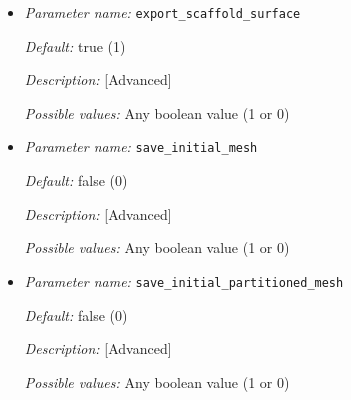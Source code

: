 \begin{itemize}
{\it Description:} [Advanced] 

{\it Possible values:} Any boolean value (1 or 0)


\item {\it Parameter name:} {\tt export\_scaffold\_surface}
\label{parameters:export_scaffold_surface}


{\it Default:} true (1)

{\it Description:} [Advanced] 

{\it Possible values:} Any boolean value (1 or 0)


\item {\it Parameter name:} {\tt save\_initial\_mesh}
\label{parameters:save_initial_mesh}


{\it Default:} false (0)

{\it Description:} [Advanced] 

{\it Possible values:} Any boolean value (1 or 0)


\item {\it Parameter name:} {\tt save\_initial\_partitioned\_mesh}
\label{parameters:save_initial_partitioned_mesh}


{\it Default:} false (0)

{\it Description:} [Advanced] 

{\it Possible values:} Any boolean value (1 or 0)


\end{itemize}
